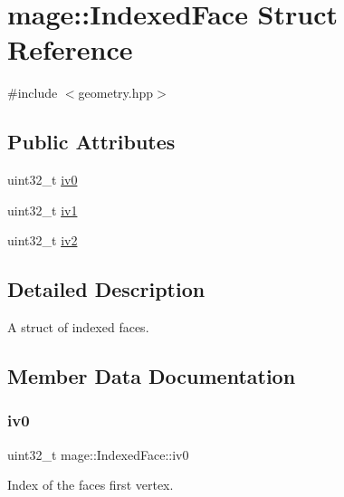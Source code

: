 \hypertarget{structmage_1_1_indexed_face}{}\section{mage\+:\+:Indexed\+Face Struct Reference}
\label{structmage_1_1_indexed_face}


{\ttfamily \#include $<$geometry.\+hpp$>$}

\subsection*{Public Attributes}
\begin{DoxyCompactItemize}
\item 
uint32\+\_\+t \hyperlink{structmage_1_1_indexed_face_aab3b522ac88751c7875b90856888e3ba}{iv0}
\item 
uint32\+\_\+t \hyperlink{structmage_1_1_indexed_face_a35469b3d2baa4c40e3b7db3074842756}{iv1}
\item 
uint32\+\_\+t \hyperlink{structmage_1_1_indexed_face_a343e5f22f65e3721b440cc6cbea50014}{iv2}
\end{DoxyCompactItemize}


\subsection{Detailed Description}
A struct of indexed faces. 

\subsection{Member Data Documentation}
\hypertarget{structmage_1_1_indexed_face_aab3b522ac88751c7875b90856888e3ba}{}\label{structmage_1_1_indexed_face_aab3b522ac88751c7875b90856888e3ba} 
\subsubsection{\texorpdfstring{iv0}{iv0}}
{\footnotesize\ttfamily uint32\+\_\+t mage\+::\+Indexed\+Face\+::iv0}

Index of the face\textquotesingle{}s first vertex. \hypertarget{structmage_1_1_indexed_face_a35469b3d2baa4c40e3b7db3074842756}{}\label{structmage_1_1_indexed_face_a35469b3d2baa4c40e3b7db3074842756} 
